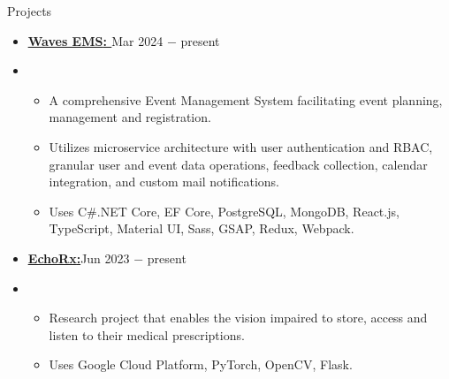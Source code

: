 \documentclass{resume}
\begin{document}
\vspace{-0.5\baselineskip}


\begin{rSection}{Projects}
      \begin{itemize}[label=\null, leftmargin=*, parsep=0.5em]
            \item {
                  \textbf{\href{https://github.com/AdwayB/waves}{\underline{Waves EMS}: }}\hfill Mar 2024 $-$ present
                  } \\
            \item {
                  \vspace{-1.2\baselineskip}
                  \begin{itemize}[label=$\bullet$]
                        \vspace{-\parskip}
                        \vspace{-\parsep}
                        \item {
                              A comprehensive Event Management System facilitating event planning, management and registration.
                              }
                        \item {
                              Utilizes microservice architecture with user authentication and RBAC, granular user and event data operations, feedback collection, calendar integration, and custom mail notifications.
                              }
                        \item {
                              Uses C\#\space.NET Core, EF Core, PostgreSQL, MongoDB, React.js, TypeScript, Material UI, Sass, GSAP, Redux, Webpack.
                              }
                  \end{itemize}
                  }


            \item {
                  \textbf{\href{https://github.com/AdwayB/EchoRx}{\underline{EchoRx}:}}\hfill Jun 2023 $-$ present
                  } \\
            \item {
                  \vspace{-1.2\baselineskip}
                  \begin{itemize}[label=$\bullet$]
                        \vspace{-\parskip}
                        \vspace{-\parsep}
                        \item {
                              Research project that enables the vision impaired to store, access and listen to their medical prescriptions.
                              }
                        \item {
                              Uses Google Cloud Platform, PyTorch, OpenCV, Flask.
                              }
                  \end{itemize}
                  }




\end{itemize}
\end{rSection}
\end{document}
